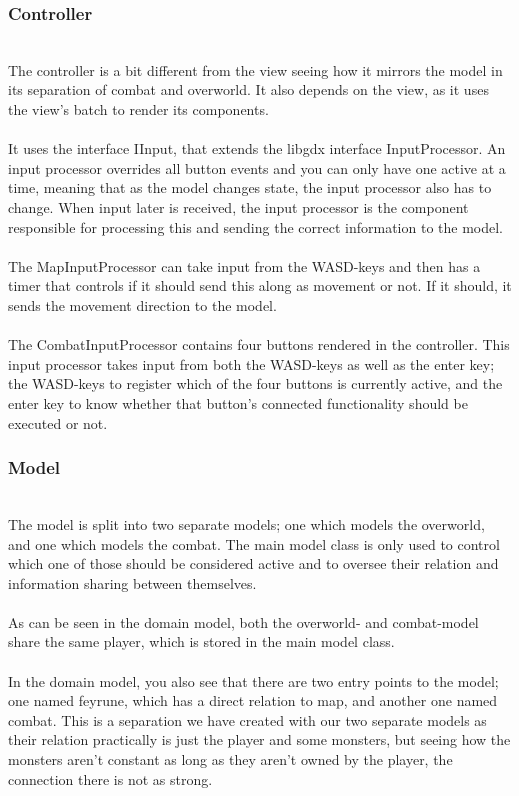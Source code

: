 \subsubsection{Controller}
\label{controller}
\\
The controller is a bit different from the view seeing how it mirrors the model in its separation of combat and overworld. It also depends on the view, as it uses the view's batch to render its components.\\
\\
It uses the interface IInput, that extends the libgdx interface InputProcessor. An input processor overrides all button events and you can only have one active at a time, meaning that as the model changes state, the input processor also has to change. When input later is received, the input processor is the component responsible for processing this and sending the correct information to the model.\\
\\
The MapInputProcessor can take input from the WASD-keys and then has a timer that controls if it should send this along as movement or not. If it should, it sends the movement direction to the model.\\
\\
The CombatInputProcessor contains four buttons rendered in the controller. This input processor takes input from both the WASD-keys as well as the enter key; the WASD-keys to register which of the four buttons is currently active, and the enter key to know whether that button's connected functionality should be executed or not.

\subsubsection{Model}
\label{model}
\\
The model is split into two separate models; one which models the overworld, and one which models the combat. The main model class is only used to control which one of those should be considered active and to oversee their relation and information sharing between themselves.\\
\\ %
As can be seen in the domain model, both the overworld- and combat-model share the same player, which is stored in the main model class.\\
\\
In the domain model, you also see that there are two entry points to the model; one named feyrune, which has a direct relation to map, and another one named combat. This is a separation we have created with our two separate models as their relation practically is just the player and some monsters, but seeing how the monsters aren't constant as long as they aren't owned by the player, the connection there is not as strong.


